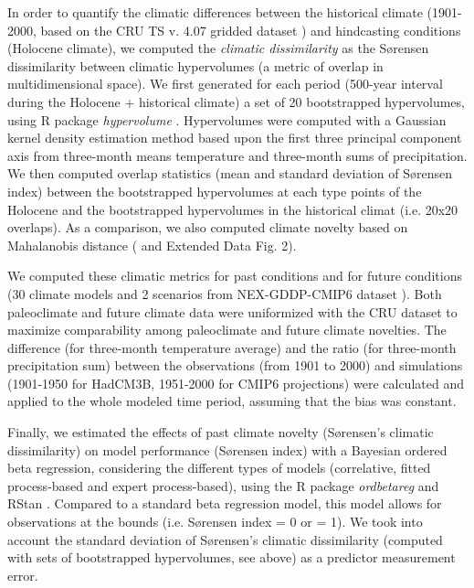 \documentclass[pdflatex, sn-nature]{sn-jnl}%
\begin{document}
In order to quantify the climatic differences between the historical climate (1901-2000, based on the CRU TS v. 4.07 gridded dataset \citep{Harris2020}) and hindcasting conditions (Holocene climate), we computed the \emph{climatic dissimilarity} as the Sørensen dissimilarity between climatic hypervolumes (a metric of overlap in multidimensional space). We first generated for each period (500-year interval during the Holocene + historical climate) a set of 20 bootstrapped hypervolumes, using R package \emph{hypervolume} \cite{Blonder2018}. Hypervolumes were computed with a Gaussian kernel density estimation method based upon the first three principal component axis from three-month means temperature and three-month sums of precipitation. We then computed overlap statistics (mean and standard deviation of Sørensen index) between the bootstrapped hypervolumes at each type points of the Holocene and the bootstrapped hypervolumes in the historical climat (i.e. 20x20 overlaps). As a comparison, we also computed climate novelty based on Mahalanobis distance (\citep{Burke2019} and Extended Data Fig. 2). 

We computed these climatic metrics for past conditions and for future conditions (30 climate models and 2 scenarios from NEX-GDDP-CMIP6 dataset \citep{Thrasher2022}). Both paleoclimate and future climate data were uniformized with the CRU dataset to maximize comparability among paleoclimate and future climate novelties. The difference (for three-month temperature average) and the ratio (for three-month precipitation sum) between the observations (from 1901 to 2000) and simulations (1901-1950 for HadCM3B, 1951-2000 for CMIP6 projections) were calculated and applied to the whole modeled time period, assuming that the bias was constant.  

Finally, we estimated the effects of past climate novelty (Sørensen's climatic dissimilarity) on model performance (Sørensen index) with a Bayesian ordered beta regression, considering the different types of models (correlative, fitted process-based and expert process-based), using the R package \emph{ordbetareg} \cite{Kubinec2023} and RStan \cite{SDT2023}. Compared to a  standard beta regression model, this model allows for observations at the bounds (i.e. Sørensen index = 0 or = 1). We took into account the standard deviation of Sørensen's climatic dissimilarity (computed with sets of bootstrapped hypervolumes, see above) as a predictor measurement error.
\end{document}
